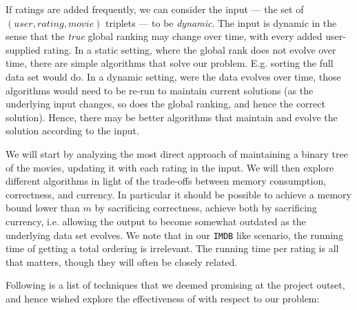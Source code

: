 \documentclass[a4paper, titlepage]{report}
\renewcommand{\%}{\scalebox{.9}{\oldpct}}
\begin{document}
If ratings are added frequently, we can consider the input --- the set of
$(user, rating, movie)$ triplets --- to be \textit{dynamic}. The input is dynamic
in the sense that the \textit{true} global ranking may change over time, with
every added user-supplied rating. 
In a static setting, where the global rank does not evolve over time, there are
simple algorithms that solve our problem. E.g. sorting the full data set would
do.
In a dynamic setting, were the data evolves over time,
those algorithms would need to be re-run to maintain current solutions (as the
underlying input changes, so does the global ranking, and hence the correct
solution). Hence, there may be better algorithms that maintain and evolve the
solution according to the input.

We will start by analyzing the most direct approach of maintaining a binary
tree of the movies, updating it with each rating in the input.
We will then explore different algorithms in light of the trade-offs between
memory consumption, correctness, and currency. In particular it should be
possible to achieve a memory bound lower than $m$ by sacrificing correctness,
achieve both by sacrificing currency, i.e. allowing the output to become
somewhat outdated as the underlying data set evolves. We note that in our
\texttt{IMDB} like scenario, the running time of getting a total ordering is
irrelevant. The running time per rating is all that matters, though they will
often be closely related.

Following is a list of techniques that we deemed promising at the project
outset, and hence wished explore the effectiveness of with respect to our
problem:
\end{document}
